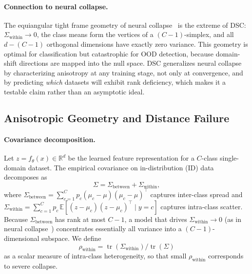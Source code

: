 \paragraph{Connection to neural collapse.}
The equiangular tight frame geometry of neural collapse~\citep{Papyan2020nc,Zhu2021nc} is the extreme of DSC: $\Sigma_{\mathrm{within}} \to 0$, the class means form the vertices of a $(C{-}1)$-simplex, and all $d - (C{-}1)$ orthogonal dimensions have exactly zero variance. This geometry is optimal for classification but catastrophic for OOD detection, because domain-shift directions are mapped into the null space. DSC generalizes neural collapse by characterizing anisotropy at any training stage, not only at convergence, and by predicting \emph{which} datasets will exhibit rank deficiency, which makes it a testable claim rather than an asymptotic ideal.

\subsection{Anisotropic Geometry and Distance Failure}
\label{subsec:dsc:aniso}

\paragraph{Covariance decomposition.}
Let $z = f_\theta(x) \in \mathbb{R}^d$ be the learned feature representation for a $C$-class single-domain dataset. The empirical covariance on in-distribution (ID) data decomposes as
\begin{equation}
  \Sigma = \Sigma_{\mathrm{between}} + \Sigma_{\mathrm{within}},
  \label{eq:dsc-cov-decomp}
\end{equation}
where $\Sigma_{\mathrm{between}} = \sum_{c=1}^C p_c (\mu_c - \mu)(\mu_c - \mu)^\top$ captures inter-class spread and $\Sigma_{\mathrm{within}} = \sum_{c=1}^C p_c\,\mathbb{E}[(z-\mu_c)(z-\mu_c)^\top \mid y{=}c]$ captures intra-class scatter. Because $\Sigma_{\mathrm{between}}$ has rank at most $C{-}1$, a model that drives $\Sigma_{\mathrm{within}} \to 0$ (as in neural collapse~\citep{Papyan2020nc}) concentrates essentially all variance into a $(C{-}1)$-dimensional subspace. We define
\begin{equation}
  \rho_{\mathrm{within}} = \operatorname{tr}(\Sigma_{\mathrm{within}})/\operatorname{tr}(\Sigma)
  \label{eq:dsc-rho-within}
\end{equation}
as a scalar measure of intra-class heterogeneity, so that small $\rho_{\mathrm{within}}$ corresponds to severe collapse.

